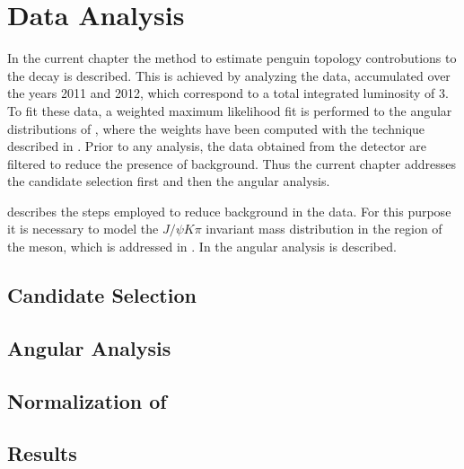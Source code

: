 \chapter{Data Analysis}
\label{Data_Analysis}

In the current chapter the method to estimate penguin topology controbutions to the \BsJpsiPhi decay
is described. This is achieved by analyzing the \runone \lhcb data, accumulated over the years 2011 and 2012,
which correspond to a total integrated luminosity of 3\invfb. To fit these data, a weighted maximum likelihood fit
is performed to the angular distributions of \BsJpsiKst, where the weights have been computed with the \sPlot
technique \cite{splot} described in .
Prior to any analysis, the data obtained from the detector are filtered to reduce the presence of
background. Thus the current chapter addresses the \Bs candidate selection first and then the angular analysis.

 describes the steps employed to reduce background in the data. For this purpose
it is necessary to model the $J/\psi K\pi$ invariant mass distribution in the region of the \Bs meson, which
is addressed in . In  the angular analysis is described.\\

\section{Candidate Selection}
\label{Event_Selection}


\section{Angular Analysis}
\label{Angular_Analysis}


\section{Normalization of \BsJpsiKpi}
\label{Normalization}


\section{Results}
\label{Results}

